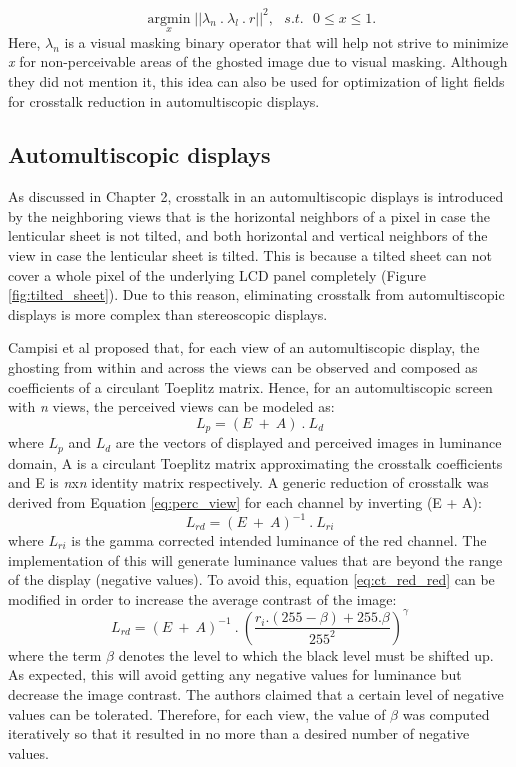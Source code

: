 \begin{equation}
\underset{x}{\operatorname{argmin}}||\lambda_n\:.\:\lambda_l \: . \: r||^2, \:\:\: s.t. \:\:\: 0 \leq x \leq 1.
\label{eq:perc_opt_vm}
\end{equation}
Here, $\lambda_n$ is a visual masking binary operator that will help not strive to minimize \emph{x} for non-perceivable areas of the ghosted image due to visual masking. Although they did not mention it, this idea can also be used for optimization of light fields for crosstalk reduction in automultiscopic displays.

\subsection{Automultiscopic displays}
As discussed in Chapter 2, crosstalk in an automultiscopic displays is introduced by the neighboring views that is the horizontal neighbors of a pixel in case the lenticular sheet is not tilted, and both horizontal and vertical neighbors of the view in case the lenticular sheet is tilted. This is because a tilted sheet can not cover a whole pixel of the underlying LCD panel completely (Figure \ref{fig:tilted_sheet}). Due to this reason, eliminating crosstalk from automultiscopic displays is more complex than stereoscopic displays.

Campisi et al \cite{barkowsky2010crosstalk} proposed that, for each view of an automultiscopic display, the ghosting from within and across the views can be observed and composed as coefficients of a circulant Toeplitz matrix. Hence, for an automultiscopic screen with \emph{n} views, the perceived views can be modeled as:
\begin{equation}
L_p = (E\:+\:A)\:.\:L_d
\label{eq:perc_view}
\end{equation}
where $L_p$ and $L_d$ are the vectors of displayed and perceived images in luminance domain, A is a circulant Toeplitz matrix approximating the crosstalk coefficients and E is \emph{n}x\emph{n} identity matrix respectively. A generic reduction of crosstalk was derived from Equation \ref{eq:perc_view} for each channel by inverting (E + A):
\begin{equation}
L_{rd} = (E\:+\:A)^{-1}\:.\:L_{ri}
\label{eq:ct_red_red}
\end{equation}
where $L_{ri}$ is the gamma corrected intended luminance of the red channel. The implementation of this will generate luminance values that are beyond the range of the display (negative values). To avoid this, equation \ref{eq:ct_red_red} can be modified in order to increase the average contrast of the image:
\begin{equation}
L_{rd} = (E\:+\:A)^{-1}\:.\:\left(\frac{r_i.(255-\beta)+255.\beta}{255^2}\right)^{\gamma}
\label{eq:ct_red_reduced_contrast}
\end{equation}
where the term $\beta$ denotes the level to which the black level must be shifted up. As expected, this will avoid getting any negative values for luminance but decrease the image contrast. The authors claimed that a certain level of negative values can be tolerated. Therefore, for each view, the value of $\beta$ was computed iteratively so that it resulted in no more than a desired number of negative values.

